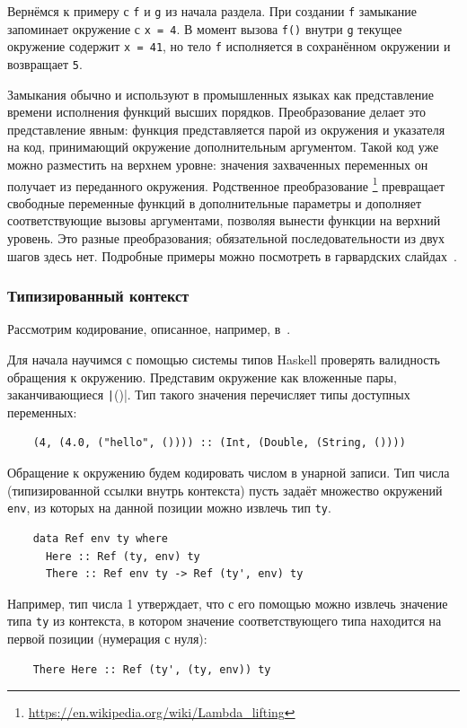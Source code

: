 Вернёмся к примеру с \texttt{f} и \texttt{g} из начала раздела.
При создании \texttt{f} замыкание запоминает окружение с \texttt{x = 4}.
В момент вызова \texttt{f()} внутри \texttt{g} текущее окружение содержит \texttt{x = 41}, но тело \texttt{f} исполняется в сохранённом окружении и возвращает \texttt{5}.

Замыкания обычно и используют в промышленных языках как представление времени исполнения функций высших порядков.
Преобразование  делает это представление явным: функция представляется парой из окружения и указателя на код, принимающий окружение дополнительным аргументом.
Такой код уже можно разместить на верхнем уровне: значения захваченных переменных он получает из переданного окружения.
Родственное преобразование \footnote{\url{https://en.wikipedia.org/wiki/Lambda_lifting}} превращает свободные переменные функций в дополнительные параметры и дополняет соответствующие вызовы аргументами, позволяя вынести функции на верхний уровень.
Это разные преобразования; обязательной последовательности из двух шагов здесь нет.
Подробные примеры можно посмотреть в гарвардских слайдах~\cite{closures-slides}.

\subsubsection{Типизированный контекст} \label{subsubsec:typed-env}

Рассмотрим кодирование, описанное, например, в~\cite{kiselyov2012typed}.

Для начала научимся с помощью системы типов Haskell проверять валидность обращения к окружению.
Представим окружение как вложенные пары, заканчивающиеся \texttt|()|.
Тип такого значения перечисляет типы доступных переменных:
\begin{verbatim}
    (4, (4.0, ("hello", ()))) :: (Int, (Double, (String, ())))
\end{verbatim}

Обращение к окружению будем кодировать числом в унарной записи.
Тип числа (типизированной ссылки внутрь контекста) пусть задаёт множество окружений \texttt{env}, из которых на данной позиции можно извлечь тип \texttt{ty}.
\begin{verbatim}
    data Ref env ty where
      Here :: Ref (ty, env) ty
      There :: Ref env ty -> Ref (ty', env) ty
\end{verbatim}
Например, тип числа 1 утверждает, что с его помощью можно извлечь значение типа \texttt{ty} из контекста, в котором значение соответствующего типа находится на первой позиции (нумерация с нуля):
\begin{verbatim}
    There Here :: Ref (ty', (ty, env)) ty
\end{verbatim}

